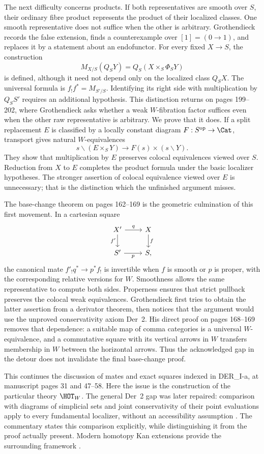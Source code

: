 The next difficulty concerns products. If both representatives are smooth over $S$, their ordinary fibre product represents the product of their localized classes. One smooth representative does not suffice when the other is arbitrary. Grothendieck records the false extension, finds a counterexample over $[1]=(0\to1)$, and replaces it by a statement about an endofunctor. For every fixed $X\to S$, the construction
\[
 M_{X/S}(Q_SY)=Q_S(X\times_S\Phi_SY)
\]
is defined, although it need not depend only on the localized class $Q_SX$. The universal formula is $f_!f^*=M_{S'/S}$. Identifying its right side with multiplication by $Q_SS'$ requires an additional hypothesis. This distinction returns on pages 199--202, where Grothendieck asks whether a weak $W$-fibration factor suffices even when the other raw representative is arbitrary. We prove that it does. If a split replacement $E$ is classified by a locally constant diagram $F:S^{\mathrm{op}}\to\Cat$, transport gives natural $W$-equivalences
\[
s\backslash(E\times_S Y)\longrightarrow F(s)\times(s\backslash Y).
\]
They show that multiplication by $E$ preserves colocal equivalences viewed over $S$. Reduction from $X$ to $E$ completes the product formula under the basic localizer hypotheses. The stronger assertion of colocal equivalence viewed over $E$ is unnecessary; that is the distinction which the unfinished argument misses.

The base-change theorem on pages 162--169 is the geometric culmination of this first movement. In a cartesian square
\[
\begin{tikzcd}
 X'\arrow[r,"q"]\arrow[d,"f'"']&X\arrow[d,"f"]\\
 S'\arrow[r,"p"']&S,
\end{tikzcd}
\]
the canonical mate $f'_!q^*\to p^*f_!$ is invertible when $f$ is smooth or $p$ is proper, with the corresponding relative versions for $W$. Smoothness allows the same representative to compute both sides. Properness ensures that strict pullback preserves the colocal weak equivalences. Grothendieck first tries to obtain the latter assertion from a derivator theorem, then notices that the argument would use the unproved conservativity axiom Der~2. His direct proof on pages 168--169 removes that dependence: a suitable map of comma categories is a universal $W$-equivalence, and a commutative square with its vertical arrows in $W$ transfers membership in $W$ between the horizontal arrows. Thus the acknowledged gap in the detour does not invalidate the final base-change proof.

This continues the discussion of mates and exact squares indexed in DER\_I-a, at manuscript pages 31 and 47--58. Here the issue is the construction of the particular theory $\HOT_W$. The general Der~2 gap was later repaired: comparison with diagrams of simplicial sets and joint conservativity of their point evaluations apply to every fundamental localizer, without an accessibility assumption \citep[Propositions~4.2.7 and~3.1.30]{Cisinski2006}. The commentary states this comparison explicitly, while distinguishing it from the proof actually present. Modern homotopy Kan extensions provide the surrounding framework \citep[\S1]{Groth2013}.

